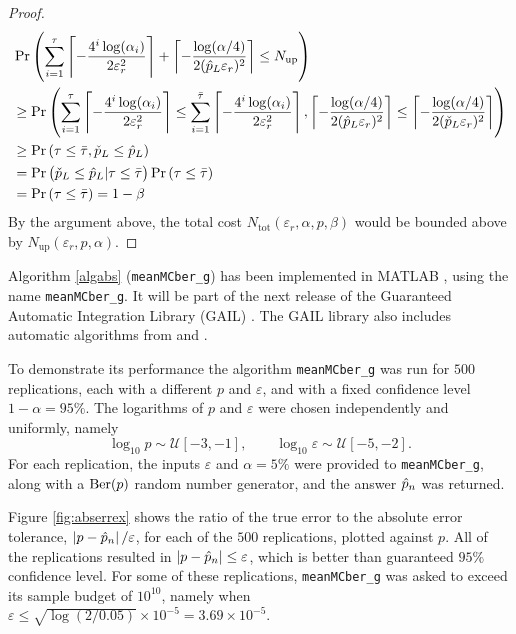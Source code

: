 \documentclass{iitthesis}
\begin{document}
\begin{proof}
\begin{align}
&\Pr\left (\sum_{i=1}^{\tau} \left \lceil -\frac{4^i \log(\alpha_i)} {2\varepsilon_r^2 } \right\rceil+\left \lceil -\frac{\log (\alpha/4)}{2  (\hat{p}_L \varepsilon_{r})^2} \right \rceil \leq N_{\text{up}}\right)\\ & \geq \Pr \left(\sum_{i=1}^{\tau} \left \lceil -\frac{4^i \log(\alpha_i)} {2\varepsilon_r^2 } \right\rceil \leq \sum_{i=1}^{\bar{\tau}} \left \lceil -\frac{4^i \log(\alpha_i)} {2\varepsilon_r^2 } \right\rceil , \left \lceil -\frac{\log (\alpha/4)}{2  (\hat{p}_L \varepsilon_{r})^2} \right \rceil \leq \left \lceil -\frac{\log (\alpha/4)}{2  (\check{p}_L \varepsilon_{r})^2} \right \rceil\right)\\&
\geq \Pr \left ( \tau \leq \bar{\tau}, \check{p}_L \leq \hat{p}_L \right ) \\&
 = \Pr \left ( \check{p}_L \leq \hat{p}_L | \tau \leq \bar{\tau}\right )\Pr \left( \tau \leq \bar{\tau}\right) \\&
 = \Pr \left( \tau \leq \bar{\tau}\right) = 1-\beta
\end{align}
By the argument above, the total cost $N_{\text{tot}}(\varepsilon_r,\alpha,p,\beta)$ would be bounded above by $N_{\text{up}}(\varepsilon_r, p,\alpha)$.
\end{proof}
Algorithm \ref{algabs} ({\tt meanMCber\_g}) has been implemented in MATLAB \cite{MATLAB14}, using the name {\tt meanMCber\_g}.  It will be part of the next release of the Guaranteed Automatic Integration Library (GAIL) \cite{GAIL_1_3}.  The GAIL library also includes automatic algorithms from  \cite{CDHHZ13} and \cite{HJLO12}.

To demonstrate its performance the algorithm {\tt meanMCber\_g} was run for $500$ replications, each with a different $p$ and $\varepsilon$, and with a fixed confidence level $1-\alpha=95\%$. The logarithms of $p$ and $\varepsilon$ were chosen independently and uniformly, namely 
\[
\log_{10} p \sim \mathcal{U}[-3,-1], \qquad \log_{10} \varepsilon \sim \mathcal{U}[-5,-2].
\]
For each replication, the inputs $\varepsilon$ and $\alpha=5\%$ were provided to {\tt meanMCber\_g}, along with a $\operatorname{Ber}(p)$ random number generator, and the answer $\hat{p}_n$ was returned.  

Figure \ref{fig:abserrex} shows the ratio of the true error to the absolute error tolerance, $\left \lvert p-\hat{p}_n \right \rvert/\varepsilon$, for each of the $500$ replications, plotted against $p$.  All of the replications resulted in $\left \lvert p-\hat{p}_n \right \rvert \le \varepsilon$, which is better than guaranteed $95\%$ confidence level.  For some of these replications, {\tt meanMCber\_g} was asked to exceed its sample budget of $10^{10}$, namely when $\varepsilon \le \sqrt{\log(2/0.05)} \times 10^{-5} = 3.69 \times 10^{-5}$.
\end{document}

